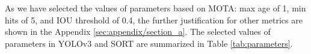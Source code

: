 As we have selected the values of parameters based on MOTA: max age of 1, min hits of 5, and IOU threshold of 0.4, the further justification for other metrics are shown in the Appendix \ref{sec:appendix/section_a}. The selected values of parameters in YOLOv3 and SORT are summarized in Table \ref{tab:parameters}.
